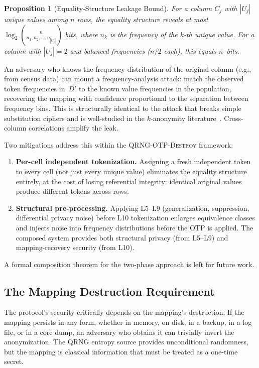 \documentclass[journal]{IEEEtran}
\newtheorem{proposition}[theorem]{Proposition}
\begin{document}
\begin{proposition}[Equality-Structure Leakage Bound]
\label{prop:equality}
For a column $C_j$ with $|U_j|$ unique values among $n$ rows, the equality structure reveals at most $\log_2 \binom{n}{n_1, n_2, \ldots, n_{|U_j|}}$ bits, where $n_k$ is the frequency of the $k$-th unique value. For a column with $|U_j| = 2$ and balanced frequencies ($n/2$ each), this equals $n$~bits.
\end{proposition}

An adversary who knows the frequency distribution of the original column (e.g., from census data) can mount a frequency-analysis attack: match the observed token frequencies in~$D'$ to the known value frequencies in the population, recovering the mapping with confidence proportional to the separation between frequency bins. This is structurally identical to the attack that breaks simple substitution ciphers and is well-studied in the $k$-anonymity literature~\cite{narayanan2008robust}. Cross-column correlations amplify the leak.

Two mitigations address this within the \textsc{QRNG-OTP-Destroy} framework:
\begin{enumerate}
\item \textbf{Per-cell independent tokenization.} Assigning a fresh independent token to every cell (not just every unique value) eliminates the equality structure entirely, at the cost of losing referential integrity: identical original values produce different tokens across rows.
\item \textbf{Structural pre-processing.} Applying L5--L9 (generalization, suppression, differential privacy noise) before L10 tokenization enlarges equivalence classes and injects noise into frequency distributions before the OTP is applied. The composed system provides both structural privacy (from L5--L9) and mapping-recovery security (from L10).
\end{enumerate}

A formal composition theorem for the two-phase approach is left for future work.

\subsection{The Mapping Destruction Requirement}
\label{subsec:destruction}

The protocol's security critically depends on the mapping's destruction. If the mapping persists in any form, whether in memory, on disk, in a backup, in a log file, or in a core dump, an adversary who obtains it can trivially invert the anonymization. The QRNG entropy source provides unconditional randomness, but the mapping is classical information that must be treated as a one-time secret.
\end{document}
